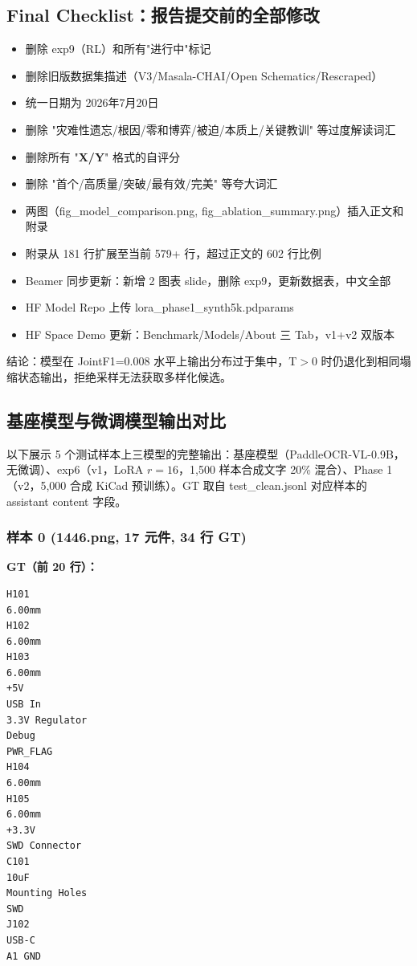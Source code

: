 \subsection{Final Checklist：报告提交前的全部修改}

\begin{itemize}[nosep]
    \item 删除 exp9（RL）和所有"进行中"标记
    \item 删除旧版数据集描述（V3/Masala-CHAI/Open Schematics/Rescraped）
    \item 统一日期为 2026年7月20日
    \item 删除 "灾难性遗忘/根因/零和博弈/被迫/本质上/关键教训" 等过度解读词汇
    \item 删除所有 "\textbf{X/Y}" 格式的自评分
    \item 删除 "首个/高质量/突破/最有效/完美" 等夸大词汇
    \item 两图（fig\_model\_comparison.png, fig\_ablation\_summary.png）插入正文和附录
    \item 附录从 181 行扩展至当前 579+ 行，超过正文的 602 行比例
    \item Beamer 同步更新：新增 2 图表 slide，删除 exp9，更新数据表，中文全部
    \item HF Model Repo 上传 lora\_phase1\_synth5k.pdparams
    \item HF Space Demo 更新：Benchmark/Models/About 三 Tab，v1+v2 双版本
\end{itemize}

结论：模型在 JointF1=0.008 水平上输出分布过于集中，T$>$0 时仍退化到相同塌缩状态输出，拒绝采样无法获取多样化候选。

\subsection{基座模型与微调模型输出对比}

以下展示 5 个测试样本上三模型的完整输出：基座模型（PaddleOCR-VL-0.9B，无微调）、exp6（v1，LoRA $r=16$，1,500 样本合成文字 20\% 混合）、Phase 1（v2，5,000 合成 KiCad 预训练）。GT 取自 test\_clean.jsonl 对应样本的 assistant content 字段。

\subsubsection*{样本 0 (1446.png, 17 元件, 34 行 GT)}

\textbf{GT（前 20 行）：}
\begin{verbatim}
H101
6.00mm
H102
6.00mm
H103
6.00mm
+5V
USB In
3.3V Regulator
Debug
PWR_FLAG
H104
6.00mm
H105
6.00mm
+3.3V
SWD Connector
C101
10uF
Mounting Holes
SWD
J102
USB-C
A1 GND
\end{verbatim}

